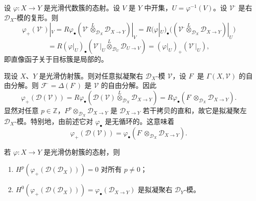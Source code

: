 设 $\varphi:X\to Y$ 是光滑代数簇的态射。设 $V$ 是 $Y$ 中开集，$U=\varphi^{-1}(V)$。设 $\mathcal{V}^\cdot$ 是右 $\mathcal{D}_X$-模的复形。则
$$\varphi_+(\mathcal{V}^\cdot)|_V=R\varphi_\bullet(\mathcal{V}^\cdot\overset{L}{\otimes}_{\mathcal{D}_X}\mathcal{D}_{X\to Y})|_V
=R(\varphi|_U)_\bullet\bigl((\mathcal{V}^\cdot\overset{L}{\otimes}_{\mathcal{D}_X}\mathcal{D}_{X\to Y})|_U\bigr)$$
$$=R(\varphi|_U)_\bullet(\mathcal{V}^\cdot|_U\overset{L}{\otimes}_{\mathcal{D}_U}\mathcal{D}_{U\to V})
=(\varphi|_U)_+(\mathcal{V}^\cdot|_U),$$
即直像函子关于目标簇是局部的。

现设 $X$、$Y$ 是光滑仿射簇。则对任意拟凝聚右 $\mathcal{D}_X$-模 $\mathcal{V}$，设 $F^\cdot$ 是 $\Gamma(X,\mathcal{V})$ 的自由分解。则 $\mathcal{F}^\cdot=\Delta(F^\cdot)$ 是 $\mathcal{V}$ 的自由分解。因此
$$\varphi_+(\mathcal{D}(\mathcal{V}))=R\varphi_\bullet(\mathcal{D}(\mathcal{V})\overset{L}{\otimes}_{\mathcal{D}_X}\mathcal{D}_{X\to Y})
=R\varphi_\bullet(F^\cdot\otimes_{\mathcal{D}_X}\mathcal{D}_{X\to Y}).$$
显然对任意 $p\in\mathbb{Z}$，$F^p\otimes_{\mathcal{D}_X}\mathcal{D}_{X\to Y}$ 是 $\mathcal{D}_{X\to Y}$ 若干拷贝的直和，故它是拟凝聚左 $\mathcal{D}_X$-模。特别地，由前述它对 $\varphi_\bullet$ 是无循环的。这意味着
$$\varphi_+(\mathcal{D}(\mathcal{V}))=\varphi_\bullet(F^\cdot\otimes_{\mathcal{D}_X}\mathcal{D}_{X\to Y}).$$

\begin{lemma}\label{lem:4.5.4}
若 $\varphi:X\to Y$ 是光滑仿射簇的态射，则
\begin{enumerate}[label=(\roman*)]
  \item $H^p(\varphi_+(\mathcal{D}(\mathcal{D}_X)))=0$ 对所有 $p\ne 0$；
  \item $H^0(\varphi_+(\mathcal{D}(\mathcal{D}_X)))=\varphi_\bullet(\mathcal{D}_{X\to Y})$ 是拟凝聚右 $\mathcal{D}_Y$-模。
\end{enumerate}
\end{lemma}

